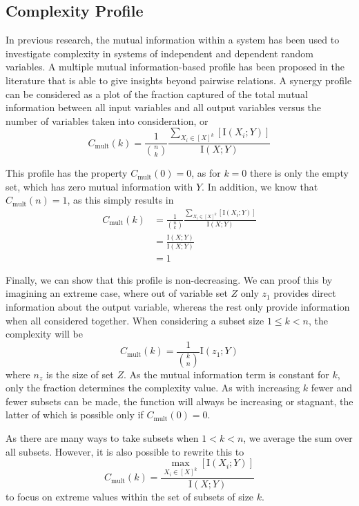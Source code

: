 \documentclass[../main.tex]{subfiles}
\begin{document}
\subsection{Complexity Profile}

In previous research, the mutual information within a system has been used to investigate complexity in systems of independent and dependent random variables.
A multiple mutual information-based profile has been proposed in the literature that is able to give insights beyond pairwise relations.
A synergy profile can be considered as a plot of the fraction captured of the total mutual information between all input variables and all output variables versus the number of variables taken into consideration, or
%
\begin{equation}
C_\mathrm{mult}(k) = \frac{1}{\binom{n}{k}}\frac{\sum_{X_i \in [X]^k} [\mathrm{I}(X_i;Y)]}{\mathrm{I}(X;Y)}
\end{equation}

This profile has the property $C_\mathrm{mult}(0) = 0$, as for $k = 0$ there is only the empty set, which has zero mutual information with $Y$.
In addition, we know that $C_\mathrm{mult}(n) = 1$, as this simply results in
%
\begin{align}
C_\mathrm{mult}(k) 
&= \frac{1}{\binom{n}{k}}\frac{\sum_{X_i \in [X]^k} [\mathrm{I}(X_i;Y)]}{\mathrm{I}(X;Y)} \\
&= \frac{\mathrm{I}(X;Y)}{\mathrm{I}(X;Y)} \\
&= 1
\end{align}

Finally, we can show that this profile is non-decreasing.
We can proof this by imagining an extreme case, where out of variable set $Z$ only $z_1$ provides direct information about the output variable, whereas the rest only provide information when all considered together.
When considering a subset size $1 \le k < n $, the complexity will be
%
\begin{equation}
C_\mathrm{mult}(k) = \frac{1}{\binom{k}{n}} \mathrm{I}(z_1;Y)
\end{equation}
%
where $n_z$ is the size of set $Z$.
As the mutual information term is constant for $k$, only the fraction determines the complexity value.
As with increasing $k$ fewer and fewer subsets can be made, the function will always be increasing or stagnant, the latter of which is possible only if $C_\mathrm{mult}(0) = 0$.

As there are many ways to take subsets when $1 < k < n$, we average the sum over all subsets.
However, it is also possible to rewrite this to
%
\begin{equation}
C_\mathrm{mult}(k) = \frac{\max_{X_i \in [X]^k} [\mathrm{I}(X_i;Y)]}{\mathrm{I}(X;Y)}
\end{equation}
%
to focus on extreme values within the set of subsets of size $k$.
\end{document}
